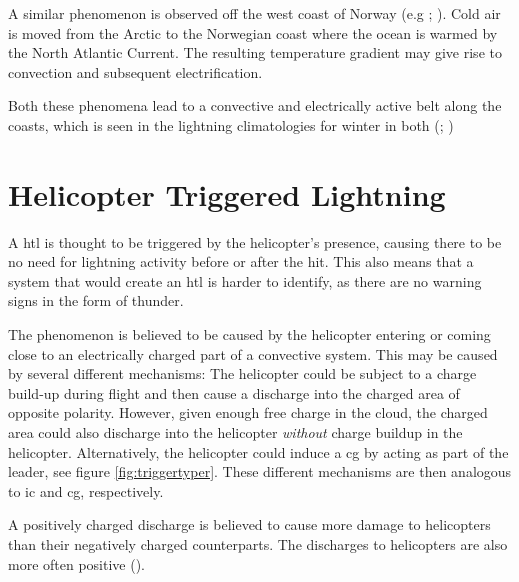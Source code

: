 A similar phenomenon is observed off the west coast of Norway (e.g \cite{koeltzow2018}; \cite{march2016}). Cold air is moved from the Arctic to the Norwegian coast where the ocean is warmed by the North Atlantic Current. The resulting temperature gradient may give rise to  convection and subsequent electrification.

Both these phenomena lead to a convective and electrically active belt along the coasts, which is seen in the lightning climatologies for winter in both (\cite{koeltzow2018}; \cite{march2016})
 
\section{Helicopter Triggered Lightning}
A \acrlong{htl} is thought to be triggered by the helicopter's presence, causing there to be no need for lightning activity before or after the hit. This also means that a system that would create an \acrshort{htl} is harder to identify, as there are no warning signs in the form of thunder. 

The phenomenon is believed to be caused by the helicopter entering or coming close to an electrically charged part of a convective system.  This may be caused by several different mechanisms: The helicopter could be subject to a charge build-up during flight and then cause a discharge into the charged area of opposite polarity. However, given enough free charge in the cloud, the charged area could also discharge into the helicopter \textit{without} charge buildup in the helicopter.  Alternatively, the helicopter could induce a \acrshort{cg} by acting as part of the leader, see figure \ref{fig:triggertyper}. These different mechanisms are then analogous to \acrshort{ic} and \acrshort{cg}, respectively. 

A positively charged discharge is believed to cause more damage to helicopters than their negatively charged counterparts. The discharges to helicopters are also more often positive  (\cite{hardwick1999}).

